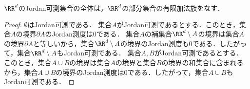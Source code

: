 \begin{theorem}[Jordan可測集合の有限加法族]
    $\RR^d$のJordan可測集合の全体は，$\RR^d$の部分集合の有限加法族をなす．
\end{theorem}
\begin{proof}
    $\emptyset$はJordan可測である．
    集合$A$がJordan可測であるとする．このとき，集合$A$の境界$\partial A$のJordan測度は0である．
    集合$A$の補集合$\RR^d \setminus A$の境界は集合$A$の境界$\partial A$と等しいから，集合$\RR^d \setminus A$の境界のJordan測度も0である．したがって，集合$\RR^d \setminus A$もJordan可測である．
    集合$A, B$がJordan可測であるとする．このとき，集合$A \cup B$の境界は集合$A$の境界と集合$B$の境界の和集合に含まれるから，集合$A \cup B$の境界のJordan測度は0である．したがって，集合$A \cup B$もJordan可測である．
\end{proof}
